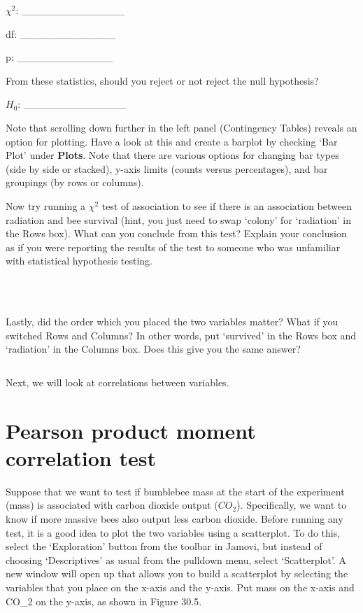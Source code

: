 \documentclass[
]{scrbook}
\begin{document}
\(\chi^{2}\): \_\_\_\_\_\_\_\_\_\_\_\_\_\_

df: \_\_\_\_\_\_\_\_\_\_\_\_\_

p: \_\_\_\_\_\_\_\_\_\_\_\_\_

From these statistics, should you reject or not reject the null hypothesis?

\(H_{0}\): \_\_\_\_\_\_\_\_\_\_\_\_\_\_

Note that scrolling down further in the left panel (Contingency Tables) reveals an option for plotting.
Have a look at this and create a barplot by checking `Bar Plot' under \textbf{Plots}.
Note that there are various options for changing bar types (side by side or stacked), y-axis limits (counts versus percentages), and bar groupings (by rows or columns).

Now try running a \(\chi^{2}\) test of association to see if there is an association between radiation and bee survival (hint, you just need to swap `colony' for `radiation' in the Rows box).
What can you conclude from this test?
Explain your conclusion as if you were reporting the results of the test to someone who was unfamiliar with statistical hypothesis testing.

\begin{verbatim}



\end{verbatim}

Lastly, did the order which you placed the two variables matter?
What if you switched Rows and Columns?
In other words, put `survived' in the Rows box and `radiation' in the Columns box.
Does this give you the same answer?

\begin{verbatim}

\end{verbatim}

Next, we will look at correlations between variables.

\hypertarget{pearson-product-moment-correlation-test}{%
\section{Pearson product moment correlation test}\label{pearson-product-moment-correlation-test}}

Suppose that we want to test if bumblebee mass at the start of the experiment (mass) is associated with carbon dioxide output (\(CO_{2}\)).
Specifically, we want to know if more massive bees also output less carbon dioxide.
Before running any test, it is a good idea to plot the two variables using a scatterplot.
To do this, select the `Exploration' button from the toolbar in Jamovi, but instead of choosing `Descriptives' as usual from the pulldown menu, select `Scatterplot'.
A new window will open up that allows you to build a scatterplot by selecting the variables that you place on the x-axis and the y-axis.
Put mass on the x-axis and CO\_2 on the y-axis, as shown in Figure 30.5.
\end{document}
